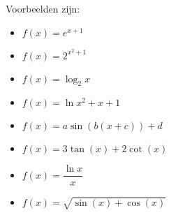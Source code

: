\documentclass[12pt]{article}
\begin{document}
Voorbeelden zijn:
\begin{multicols}{2}
  \begin{itemize}
    \item $\displaystyle f(x)=e^{x+1}$
    \item $\displaystyle f(x)=2^{x^2+1}$
    \item $\displaystyle f(x)=\log_2{x}$
    \item $\displaystyle f(x)=\ln{x^2+x+1}$
    \item $\displaystyle f(x)=a\sin(b(x+c))+d$
    \item $\displaystyle f(x)=3\tan(x)+2\cot(x)$
    \item $\displaystyle f(x)=\dfrac{\ln{x}}{x}$
    \item $\displaystyle f(x)=\sqrt{\sin(x)+\cos(x)}$
  \end{itemize}
\end{multicols}
\end{document}
